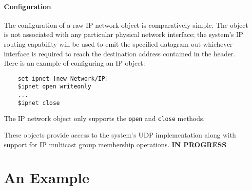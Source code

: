 \paragraph{Configuration}
The configuration of a raw IP network object is comparatively
simple.
The object is not associated with any particular physical network
interface; the system's IP routing capability will be used to
emit the specified datagram out whichever interface is required
to reach the destination address contained in the header.
Here is an example of configuring an IP object:
\begin{verbatim}
    set ipnet [new Network/IP]
    $ipnet open writeonly
    ...
    $ipnet close
\end{verbatim}
The IP network object only supports the {\tt open} and {\tt close}
methods.


These objects provide access to the system's UDP implementation
along with support for IP multicast group membership operations.
{\bf IN PROGRESS}

\section{An Example}

